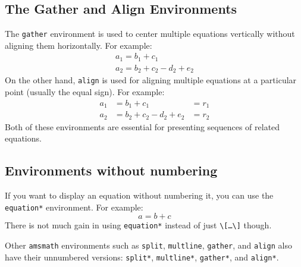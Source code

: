 \subsection{The Gather and Align Environments}
\par The \verb"gather" environment is used to center multiple equations vertically without aligning them horizontally. For example:
\begin{gather}
    a_1=b_1+c_1\\
    a_2=b_2+c_2-d_2+e_2
\end{gather}
On the other hand, \verb"align" is used for aligning multiple equations at a particular point (usually the equal sign). For example:
\begin{align}
    a_1& =b_1+c_1 & = r_1\\
    a_2& =b_2+c_2-d_2+e_2 &= r_2
\end{align}
Both of these environments are essential for presenting sequences of related equations.

\subsection{Environments without numbering}
\par If you want to display an equation without numbering it, you can use the \verb"equation*" environment. For example:
\begin{equation*}
    a=b+c
\end{equation*}
There is not much gain in using \verb"equation*" instead of just \verb"\[…\]" though.

Other \verb"amsmath" environments such as \verb"split", \verb"multline", \verb"gather", and \verb"align" also have their unnumbered versions: \verb"split*", \verb"multline*", \verb"gather*", and \verb"align*".

